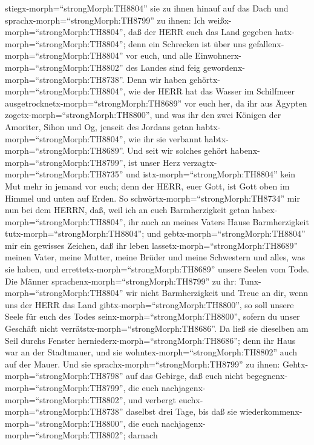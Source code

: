 stiegx-morph=``strongMorph:TH8804'' sie zu ihnen hinauf auf das Dach
 und sprachx-morph=``strongMorph:TH8799'' zu ihnen: Ich
weißx-morph=``strongMorph:TH8804'', daß der HERR euch das Land gegeben
hatx-morph=``strongMorph:TH8804''; denn ein Schrecken ist über uns
gefallenx-morph=``strongMorph:TH8804'' vor euch, und alle
Einwohnerx-morph=``strongMorph:TH8802'' des Landes sind feig
gewordenx-morph=``strongMorph:TH8738''.  Denn wir haben
gehörtx-morph=``strongMorph:TH8804'', wie der HERR hat das Wasser im
Schilfmeer ausgetrocknetx-morph=``strongMorph:TH8689'' vor euch her, da
ihr aus Ägypten zogetx-morph=``strongMorph:TH8800'', und was ihr den
zwei Königen der Amoriter, Sihon und Og, jenseit des Jordans getan
habtx-morph=``strongMorph:TH8804'', wie ihr sie verbannt
habtx-morph=``strongMorph:TH8689''.  Und seit wir solches
gehört habenx-morph=``strongMorph:TH8799'', ist unser Herz
verzagtx-morph=``strongMorph:TH8735'' und
istx-morph=``strongMorph:TH8804'' kein Mut mehr in jemand vor euch; denn
der HERR, euer Gott, ist Gott oben im Himmel und unten auf Erden.
 So schwörtx-morph=``strongMorph:TH8734'' mir nun bei dem
HERRN, daß, weil ich an euch Barmherzigkeit getan
habex-morph=``strongMorph:TH8804'', ihr auch an meines Vaters Hause
Barmherzigkeit tutx-morph=``strongMorph:TH8804''; und
gebtx-morph=``strongMorph:TH8804'' mir ein gewisses Zeichen,
 daß ihr leben lassetx-morph=``strongMorph:TH8689'' meinen
Vater, meine Mutter, meine Brüder und meine Schwestern und alles, was
sie haben, und errettetx-morph=``strongMorph:TH8689'' unsere Seelen vom
Tode.  Die Männer sprachenx-morph=``strongMorph:TH8799'' zu
ihr: Tunx-morph=``strongMorph:TH8804'' wir nicht Barmherzigkeit und
Treue an dir, wenn uns der HERR das Land
gibtx-morph=``strongMorph:TH8800'', so soll unsere Seele für euch des
Todes seinx-morph=``strongMorph:TH8800'', sofern du unser Geschäft nicht
verrätstx-morph=``strongMorph:TH8686''.  Da ließ sie
dieselben am Seil durchs Fenster
herniederx-morph=``strongMorph:TH8686''; denn ihr Haus war an der
Stadtmauer, und sie wohntex-morph=``strongMorph:TH8802'' auch auf der
Mauer.  Und sie sprachx-morph=``strongMorph:TH8799'' zu
ihnen: Gehtx-morph=``strongMorph:TH8798'' auf das Gebirge, daß euch
nicht begegnenx-morph=``strongMorph:TH8799'', die euch
nachjagenx-morph=``strongMorph:TH8802'', und verbergt
euchx-morph=``strongMorph:TH8738'' daselbst drei Tage, bis daß sie
wiederkommenx-morph=``strongMorph:TH8800'', die euch
nachjagenx-morph=``strongMorph:TH8802''; darnach
